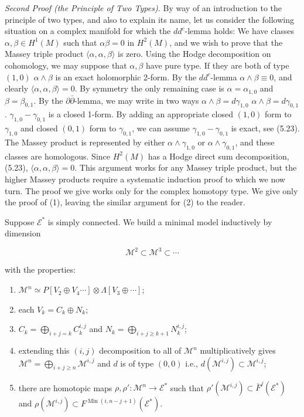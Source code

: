 \documentclass[
  english,
  a3paper,
  a3paper]{extarticle}
\begin{document}
\emph{Second Proof (the Principle of Two Types).} By way of an
introduction to the principle of two types, and also to explain its
name, let us consider the following situation on a complex manifold for
which the \(dd^c\)-lemma holds: We have classes
\(\alpha,\beta\in H^1(M)\) such that \(\alpha\beta=0\) in \(H^2(M)\),
and we wish to prove that the Massey triple product
\(\langle\alpha,\alpha,\beta\rangle\) is zero. Using the Hodge
decomposition on cohomology, we may suppose that \(\alpha,\beta\) have
pure type. If they are both of type \((1,0)\) \(\alpha\wedge\beta\) is
an exact holomorphic 2-form. By the \(dd^c\)-lemma
\(\alpha\wedge\beta\equiv0\), and clearly
\(\langle\alpha,\alpha,\beta\rangle=0\). By symmetry the only remaining
case is \(\alpha=\alpha_{1,0}\) and \(\beta=\beta_{0,1}\). By the
\(\partial\bar\partial\)-lemma, we may write in two ways
\(\alpha\wedge\beta=d\gamma_{1,0}\) \(\alpha\wedge\beta=d\gamma_{0,1}\).
\(\gamma_{1,0}-\gamma_{0,1}\) is a closed 1-form. By adding an
appropriate closed \((1,0)\) form to \(\gamma_{1,0}\) and closed
\((0,1)\) form to \(\gamma_{0,1}\), we can assume
\(\gamma_{1,0}-\gamma_{0,1}\) is exact, see (5.23). The Massey product
is represented by either \(\alpha\wedge\gamma_{1,0}\) or
\(\alpha\wedge\gamma_{0,1}\), and these classes are homologous. Since
\(H^2(M)\) has a Hodge direct sum decomposition, (5.23),
\(\langle\alpha,\alpha,\beta\rangle=0\). This argument works for any
Massey triple product, but the higher Massey products require a
systematic induction proof to which we now turn. The proof we give works
only for the complex homotopy type. We give only the proof of (1),
leaving the similar argument for (2) to the reader.

Suppose \(\mathcal{E}^*\) is simply connected. We build a minimal model
inductively by dimension

\[\mathcal{M}^2\subset\mathcal{M}^3\subset\cdots\]

with the properties:

\begin{enumerate}
\def\labelenumi{\arabic{enumi})}
\item
  \(\mathcal{M}^n\simeq P[V_2\oplus V_4\cdots]\otimes\Lambda[V_3\oplus\cdots]\);
\item
  each \(V_k=C_k\oplus N_k\);
\item
  \(C_k=\bigoplus_{i+j=k}C_k^{i,j}\) and
  \(N_k=\bigoplus_{i+j\geq k+1}N_k^{i,j}\);
\item
  extending this \((i,j)\) decomposition to all of \(\mathcal{M}^n\)
  multiplicatively gives
  \(\mathcal{M}^n=\bigoplus_{i+j\geq n}\mathcal{M}^{i,j}\) and \(d\) is
  of type \((0,0)\) i.e.,
  \(d(\mathcal{M}^{i,j})\subset\mathcal{M}^{i,j}\);
\item
  there are homotopic maps \(\rho,\rho':\mathcal{M}^n\to\mathcal{E}^*\)
  such that \(\rho'(\mathcal{M}^{i,j})\subset\bar F^j(\mathcal{E}^*)\)
  and
  \(\rho(\mathcal{M}^{i,j})\subset F^{\operatorname{Min}(i,n-j+1)}(\mathcal{E}^*)\).
\end{enumerate}
\end{document}
